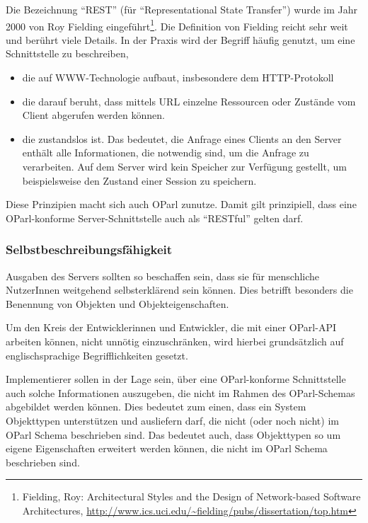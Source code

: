 \documentclass[,a4paper]{article}
\begin{document}
Die Bezeichnung ``REST'' (für ``Representational State Transfer'') wurde
im Jahr 2000 von Roy Fielding eingeführt\footnote{Fielding, Roy:
  Architectural Styles and the Design of Network-based Software
  Architectures,
  \url{http://www.ics.uci.edu/~fielding/pubs/dissertation/top.htm}}. Die
Definition von Fielding reicht sehr weit und berührt viele Details. In
der Praxis wird der Begriff häufig genutzt, um eine Schnittstelle zu
beschreiben,

\begin{itemize}
\itemsep1pt\parskip0pt
\item
  die auf WWW-Technologie aufbaut, insbesondere dem HTTP-Protokoll
\item
  die darauf beruht, dass mittels URL einzelne Ressourcen oder Zustände
  vom Client abgerufen werden können.
\item
  die zustandslos ist. Das bedeutet, die Anfrage eines Clients an den
  Server enthält alle Informationen, die notwendig sind, um die Anfrage
  zu verarbeiten. Auf dem Server wird kein Speicher zur Verfügung
  gestellt, um beispielsweise den Zustand einer Session zu speichern.
\end{itemize}

Diese Prinzipien macht sich auch OParl zunutze. Damit gilt prinzipiell,
dass eine OParl-konforme Server-Schnittstelle auch als ``RESTful''
gelten darf.

\subsubsection{Selbstbeschreibungsfähigkeit}\label{selbstbeschreibungsfuxe4higkeit}

Ausgaben des Servers sollten so beschaffen sein, dass sie für
menschliche NutzerInnen weitgehend selbsterklärend sein können. Dies
betrifft besonders die Benennung von Objekten und Objekteigenschaften.

Um den Kreis der Entwicklerinnen und Entwickler, die mit einer OParl-API
arbeiten können, nicht unnötig einzuschränken, wird hierbei
grundsätzlich auf englischsprachige Begrifflichkeiten gesetzt.


Implementierer sollen in der Lage sein, über eine OParl-konforme
Schnittstelle auch solche Informationen auszugeben, die nicht im Rahmen
des OParl-Schemas abgebildet werden können. Dies bedeutet zum einen,
dass ein System Objekttypen unterstützen und ausliefern darf, die nicht
(oder noch nicht) im OParl Schema beschrieben sind. Das bedeutet auch,
dass Objekttypen so um eigene Eigenschaften erweitert werden können, die
nicht im OParl Schema beschrieben sind.
\end{document}
